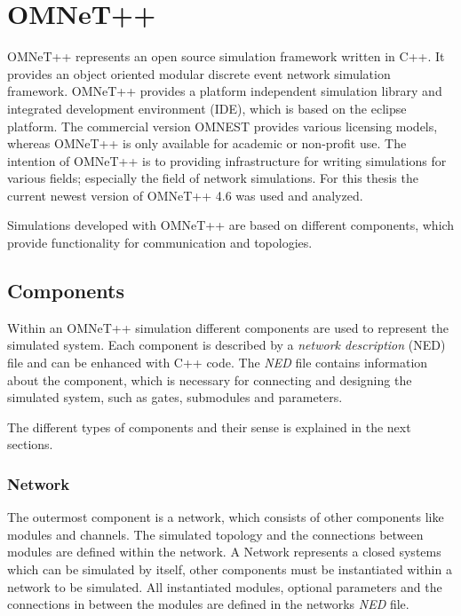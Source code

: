 \chapter{OMNeT++}
\label{cha:omnet}

OMNeT++ represents an open source simulation framework written in C++.
It provides an object oriented modular discrete event network simulation framework.
OMNeT++ provides a platform independent simulation library and integrated development environment (IDE), which is based on the eclipse platform.
The commercial version OMNEST provides various licensing models, whereas OMNeT++ is only available for academic or non-profit use.
The intention of OMNeT++ is to providing infrastructure for writing simulations for various fields; especially the field of network simulations.
For this thesis the current newest version of OMNeT++ 4.6 was used and analyzed.

Simulations developed with OMNeT++ are based on different components, which provide functionality for communication and topologies.

\section{Components}
\label{sec:omnet_components}
Within an OMNeT++ simulation different components are used to represent the simulated system.
Each component is described by a \emph{network description} (NED) file and can be enhanced with C++ code.
The \emph{NED} file contains information about the component, which is necessary for connecting and designing the simulated system, such as gates, submodules and parameters.

The different types of components and their sense is explained in the next sections.

\subsection{Network}
\label{sec:omnet_components_network}
The outermost component is a network, which consists of other components like modules and channels.
The simulated topology and the connections between modules are defined within the network.
A Network represents a closed systems which can be simulated by itself, other components must be instantiated within a network to be simulated.
All instantiated modules, optional parameters and the connections in between the modules are defined in the networks \emph{NED} file. \cite[section 3.2.1]{omnet_manual}

